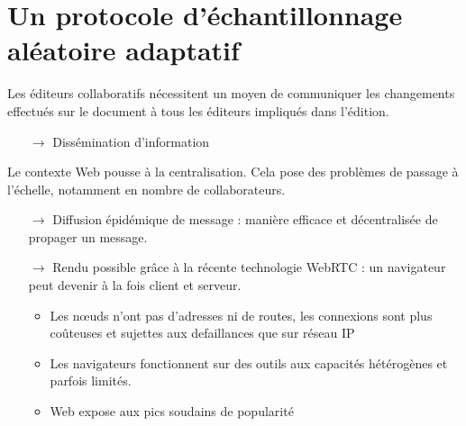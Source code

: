 \section{Un protocole d'échantillonnage aléatoire adaptatif}

\begin{frame}
  Les éditeurs collaboratifs nécessitent un moyen de communiquer les changements
  effectués sur le document à tous les éditeurs impliqués dans l'édition.
  
  \begin{itemize}
  \item [$\rightarrow$] Dissémination d'information
  \end{itemize}
  \vspace{0.5cm}

  Le contexte Web pousse à la centralisation. Cela pose des problèmes de passage
  à l'échelle, notamment en nombre de collaborateurs.

  \begin{itemize}
  \item [$\rightarrow$] Diffusion épidémique de message : manière efficace et
    décentralisée de propager un message.
  \item [$\rightarrow$] Rendu possible grâce à la récente technologie WebRTC :
    un navigateur peut devenir à la fois client et serveur.
    \begin{itemize}
    \item Les nœuds n'ont pas d'adresses ni de routes, les connexions sont plus
      coûteuses et sujettes aux defaillances que sur réseau IP
    \item Les navigateurs fonctionnent sur des outils aux capacités hétérogènes
      et parfois limités.
    \item Web expose aux pics soudains de popularité
    \end{itemize}
  \end{itemize}
  

\end{frame}

